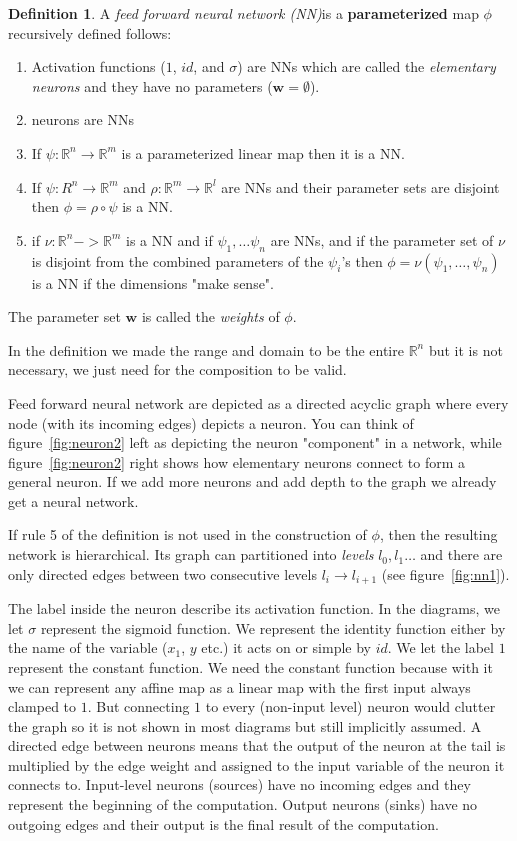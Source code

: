 \documentclass[11pt, a4paper]{report}
\theoremstyle{plain}
\theoremstyle{definition}
\newtheorem{mydef}{Definition}[chapter]
\theoremstyle{remark}
\newcommand{\R}{\mathbb{R}}
\newcommand{\w}{\mathbf{w}}
\begin{document}
\begin{mydef}
\label{def:NN}
A \emph{feed forward neural network (NN)}is a \textbf{parameterized} map $\phi$
recursively defined
follows:
\begin{enumerate}
\item{} 
Activation functions ($1$, $id$, and $\sigma$) are NNs which are called the
\emph{elementary neurons} and they have no parameters ($\w=\emptyset$).
\item{} neurons are NNs
\item{} If $\psi :\R^n \to \R^m$ is a parameterized linear map then it is a NN.
\item{} If $\psi : R^n \to \R^m$
and $\rho: \R^m \to \R^l$ are NNs and their parameter sets are disjoint then $\phi = \rho
\circ \psi$ is a NN.
\item{} if $\nu:\R^n->\R^m$ is a NN and if $\psi_1, \dots \psi_n$ are NNs,
and if the parameter set of $\nu$ is disjoint from the combined parameters of
the $\psi_i$'s then
$\phi = \nu(\psi_1, \dots, \psi_n)$ is a NN if the dimensions "make sense".
\end{enumerate}

The parameter set $\w$ is called the \emph{weights} of $\phi$.

In the definition we made the range and domain to be the entire $\R^n$ but
it is not necessary, we just need for the composition to be valid.
\end{mydef}

Feed forward neural network 
are depicted as a directed acyclic graph where every node (with its incoming
edges) depicts a neuron.
You can think of figure~\ref{fig:neuron2} left as depicting the neuron "component" 
in a network, while figure~\ref{fig:neuron2} right shows how elementary neurons
connect to form a general neuron. If we add more neurons and add depth to the
graph we already get a neural network.

If rule 5 of the definition is not used in the construction of $\phi$, then the
resulting network is hierarchical. Its graph can partitioned into \emph{levels}
$l_0, l_1\dots$ and there are only directed edges between two consecutive
levels $l_i \to l_{i+1}$ (see figure~\ref{fig:nn1}).

The label inside the neuron describe its activation function.
In the diagrams, we let $\sigma$ represent the sigmoid function.
We represent the identity function either by the name of the variable ($x_1$,
$y$ etc.) it acts on or simple by 
$id$.   We let the label $1$ represent the constant function. We need the
constant function because with it we can represent any affine map as a linear
map with the first input always clamped to $1$. But connecting $1$ to every
(non-input level) neuron would clutter the graph so it is not shown in most
diagrams but still implicitly assumed.
A directed edge between neurons means that the output of the neuron at the tail
is multiplied by the edge weight and assigned to the input variable of the
neuron it connects to.
Input-level neurons (sources) have no incoming edges and they represent the
beginning of the
computation.
Output neurons (sinks) have no outgoing edges and their output is the final result of
the computation.
\end{document}
